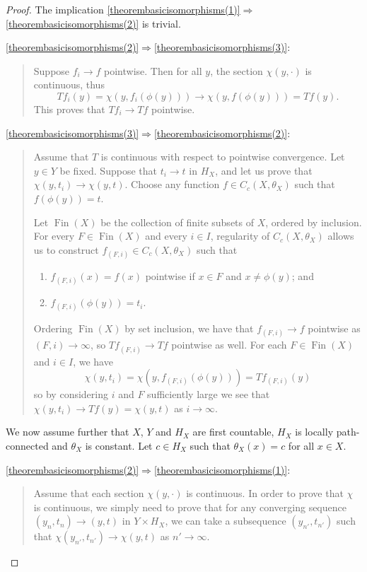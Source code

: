 \documentclass[letter,11pt]{amsart}
\theoremstyle{plain}		\newtheorem{theorem}[generalnumbering]{Theorem}
\theoremstyle{plain}		\newtheorem{corollary}[generalnumbering]{Corollary}
\theoremstyle{definition}		\newtheorem{definition}[generalnumbering]{Definition}
\theoremstyle{definition}		\newtheorem{example}[generalnumbering]{Example}
\theoremstyle{plain}		\newtheorem{proposition}[generalnumbering]{Proposition}
\theoremstyle{plain}		\newtheorem{lemma}[generalnumbering]{Lemma}
\theoremstyle{plain}    \newtheorem{plainstyle}[generalnumbering]{\namefordifferentenvironment}
\theoremstyle{plain}    \newtheorem*{plainstyle*}{\namefordifferentenvironment}
\theoremstyle{definition}    \newtheorem{definitionstyle}[generalnumbering]{\namefordifferentenvironment}
\theoremstyle{definition}    \newtheorem*{definitionstyle*}{\namefordifferentenvironment}
\begin{document}
\begin{proof}
	The implication \ref{theorembasicisomorphisms(1)}$\Rightarrow$\ref{theorembasicisomorphisms(2)} is trivial.
	
	\ref{theorembasicisomorphisms(2)}$\Rightarrow$\ref{theorembasicisomorphisms(3)}:
	\begin{quote}	
	Suppose $f_i\to f$ pointwise. Then for all $y$, the section $\chi(y,\cdot)$ is continuous, thus
		\[Tf_i(y)=\chi(y,f_i(\phi(y)))\to\chi(y,f(\phi(y)))=Tf(y).\]
		This proves that $Tf_i\to Tf$ pointwise.
	\end{quote}
	
	\ref{theorembasicisomorphisms(3)}$\Rightarrow$\ref{theorembasicisomorphisms(2)}:
	\begin{quote}
	Assume that $T$ is continuous with respect to pointwise convergence. Let $y\in Y$ be fixed. Suppose that $t_i\to t$ in $H_X$, and let us prove that $\chi(y,t_i)\to\chi(y,t)$. Choose any function $f\in C_c(X,\theta_X)$ such that $f(\phi(y))=t$.
		
		Let $\operatorname{Fin}(X)$ be the collection of finite subsets of $X$, ordered by inclusion. For every $F\in\operatorname{Fin}(X)$ and every $i\in I$, regularity of $C_c(X,\theta_X)$ allows us to construct $f_{(F,i)}\in C_c(X,\theta_X)$ such that
		\begin{enumerate}[label=(\roman*)]
			\item $f_{(F,i)}(x)=f(x)$ pointwise if $x\in F$ and $x\neq \phi(y)$; and
			\item $f_{(F,i)}(\phi(y))=t_i$.
		\end{enumerate}
		Ordering $\operatorname{Fin}(X)$ by set inclusion, we have that $f_{(F,i)}\to f$ pointwise as $(F,i)\to\infty$, so $Tf_{(F,i)}\to Tf$ pointwise as well. For each $F\in\operatorname{Fin}(X)$ and $i\in I$, we have
		\[\chi(y,t_i)=\chi(y,f_{(F,i)}(\phi(y)))=Tf_{(F,i)}(y)\]
		so by considering $i$ and $F$ sufficiently large we see that $\chi(y,t_i)\to Tf(y)=\chi(y,t)$ as $i\to\infty$.
	\end{quote}
	We now assume further that $X$, $Y$ and $H_X$ are first countable, $H_X$ is locally path-connected and $\theta_X$ is constant. Let $c\in H_X$ such that $\theta_X(x)=c$ for all $x\in X$.
	
	\ref{theorembasicisomorphisms(2)}$\Rightarrow$\ref{theorembasicisomorphisms(1)}:

	\begin{quote}
		Assume that each section $\chi(y,\cdot)$ is continuous. In order to prove that $\chi$ is continuous, we simply need to prove that for any converging sequence $(y_n,t_n)\to (y,t)$ in $Y\times H_X$, we can take a subsequence $(y_{n'},t_{n'})$ such that $\chi(y_{n'},t_{n'})\to \chi(y,t)$ as $n'\to\infty$.
		

\end{quote}
\end{proof}
\end{document}

